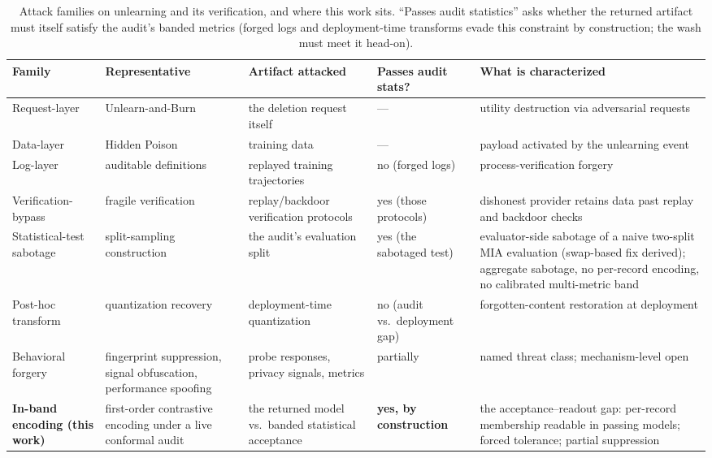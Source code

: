 \documentclass[lettersize,journal]{IEEEtran}
\begin{document}
\begin{table}[t]
\caption{Attack families on unlearning and its verification, and
where this work sits. ``Passes audit statistics'' asks whether the
returned artifact must itself satisfy the audit's banded metrics
(forged logs and deployment-time transforms evade this constraint by
construction; the wash must meet it head-on).}
\label{tab:neighbors}
\centering
\small
\begin{tabular}{p{24mm}p{28mm}p{24mm}p{16mm}p{42mm}}
\toprule
Family & Representative & Artifact attacked & Passes audit stats? & What is characterized \\
\midrule
Request-layer & Unlearn-and-Burn \cite{huang2025unlearn} & the deletion request itself & --- & utility destruction via adversarial requests \\
Data-layer & Hidden Poison \cite{di2023hidden} & training data & --- & payload activated by the unlearning event \\
Log-layer & auditable definitions \cite{thudi2022necessity} & replayed training trajectories & no (forged logs) & process-verification forgery \\
Verification-bypass & fragile verification \cite{zhang2024fragile} & replay/backdoor verification protocols & yes (those protocols) & dishonest provider retains data past replay and backdoor checks \\
Statistical-test sabotage & split-sampling construction \cite{tu2025reliable} & the audit's evaluation split & yes (the sabotaged test) & evaluator-side sabotage of a naive two-split MIA evaluation (swap-based fix derived); aggregate sabotage, no per-record encoding, no calibrated multi-metric band \\
Post-hoc transform & quantization recovery \cite{zhang2025catastrophic} & deployment-time quantization & no (audit vs.\ deployment gap) & forgotten-content restoration at deployment \\
Behavioral forgery & fingerprint suppression, signal obfuscation, performance spoofing \cite{xue2025survey} & probe responses, privacy signals, metrics & partially & named threat class; mechanism-level open \\
\midrule
\textbf{In-band encoding (this work)} & first-order contrastive encoding under a live conformal audit & the returned model vs.\ banded statistical acceptance & \textbf{yes, by construction} & the acceptance--readout gap: per-record membership readable in passing models; forced tolerance; partial suppression \\
\bottomrule
\end{tabular}
\end{table}
\end{document}
